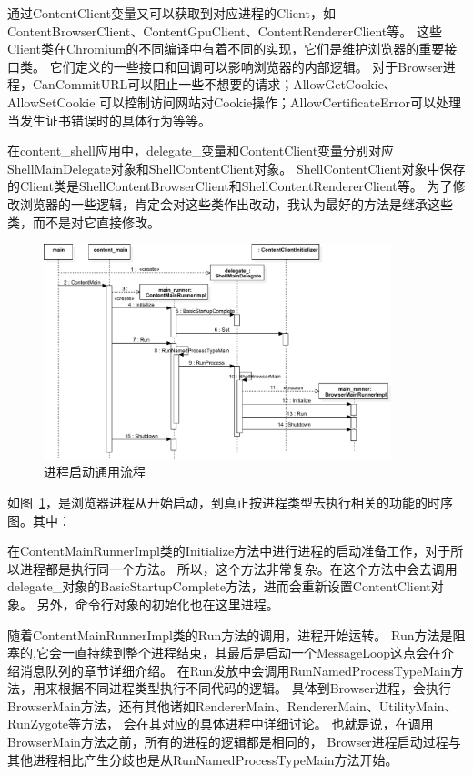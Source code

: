 通过ContentClient变量又可以获取到对应进程的Client，如ContentBrowserClient、ContentGpuClient、ContentRendererClient等。
这些Client类在Chromium的不同编译中有着不同的实现，它们是维护浏览器的重要接口类。
它们定义的一些接口和回调可以影响浏览器的内部逻辑。
对于Browser进程，CanCommitURL可以阻止一些不想要的请求；AllowGetCookie、AllowSetCookie
可以控制访问网站对Cookie操作；AllowCertificateError可以处理当发生证书错误时的具体行为等等。

在content\_shell应用中，delegate\_变量和ContentClient变量分别对应ShellMainDelegate对象和ShellContentClient对象。
ShellContentClient对象中保存的Client类是ShellContentBrowserClient和ShellContentRendererClient等。
为了修改浏览器的一些逻辑，肯定会对这些类作出改动，我认为最好的方法是继承这些类，而不是对它直接修改。

\begin{figure}[H] 
  \centering 
  \includegraphics[width=0.90\textwidth]{image/process_study/ContentMainRunnerSequence.pdf} 
  \caption{进程启动通用流程} \label{fig:ContentMainRunnerSequence} 
\end{figure}

如图~\ref{fig:ContentMainRunnerSequence}，是浏览器进程从开始启动，到真正按进程类型去执行相关的功能的时序图。其中：

在ContentMainRunnerImpl类的Initialize方法中进行进程的启动准备工作，对于所以进程都是执行同一个方法。
所以，这个方法非常复杂。在这个方法中会去调用delegate\_对象的BasicStartupComplete方法，进而会重新设置ContentClient对象。
另外，命令行对象的初始化也在这里进程。

随着ContentMainRunnerImpl类的Run方法的调用，进程开始运转。
Run方法是阻塞的,它会一直持续到整个进程结束，其最后是启动一个MessageLoop这点会在介绍消息队列的章节详细介绍。
在Run发放中会调用RunNamedProcessTypeMain方法，用来根据不同进程类型执行不同代码的逻辑。
具体到Browser进程，会执行BrowserMain方法，还有其他诸如RendererMain、RendererMain、UtilityMain、RunZygote等方法，
会在其对应的具体进程中详细讨论。
也就是说，在调用BrowserMain方法之前，所有的进程的逻辑都是相同的，
Browser进程启动过程与其他进程相比产生分歧也是从RunNamedProcessTypeMain方法开始。

